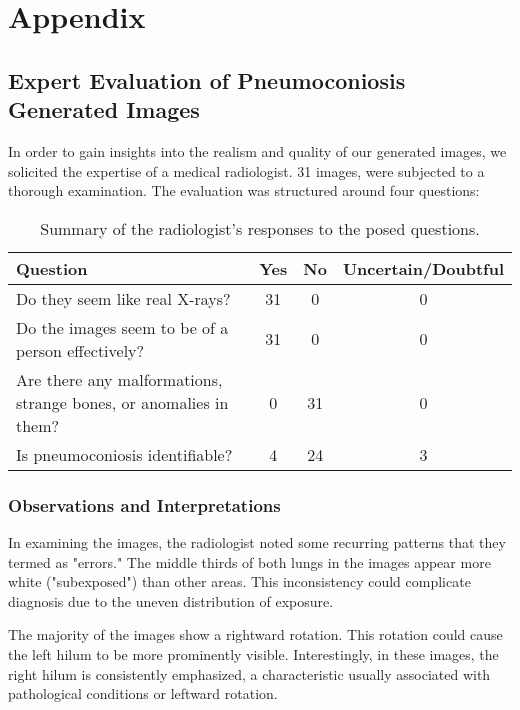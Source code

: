 
\chapter{Appendix}

\section{Expert Evaluation of Pneumoconiosis Generated Images}
\label{sec:expert_eval}

In order to gain insights into the realism and quality of our generated images, we solicited the expertise of a medical radiologist. 31 images, were subjected to a thorough examination. The evaluation was structured around four questions:

\begin{table}[ht]
\centering
\begin{tabular}{|p{5cm}|c|c|c|}
\hline
\textbf{Question} & \textbf{Yes} & \textbf{No} & \textbf{Uncertain/Doubtful} \\
\hline
Do they seem like real X-rays? & 31 & 0 & 0 \\
\hline
Do the images seem to be of a person effectively? & 31 & 0 & 0 \\
\hline
Are there any malformations, strange bones, or anomalies in them? & 0 & 31 & 0 \\
\hline
Is pneumoconiosis identifiable? & 4 & 24 & 3 \\
\hline
\end{tabular}
\caption{Summary of the radiologist's responses to the posed questions.}
\end{table}

\subsection{Observations and Interpretations}

In examining the images, the radiologist noted some recurring patterns that they termed as "errors." The middle thirds of both lungs in the images appear more white ("subexposed") than other areas. This inconsistency could complicate diagnosis due to the uneven distribution of exposure.

The majority of the images show a rightward rotation. This rotation could cause the left hilum to be more prominently visible. Interestingly, in these images, the right hilum is consistently emphasized, a characteristic usually associated with pathological conditions or leftward rotation.

